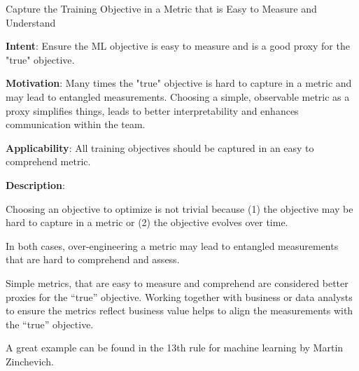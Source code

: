   
  \begin{frame}[plain]{ Capture the Training Objective in a Metric that is Easy to Measure and Understand
 }

  \textbf{Intent}: Ensure the ML objective is easy to measure and is a good proxy for the "true" objective. 
 

  \textbf{Motivation}: Many times the "true" objective is hard to capture in a metric and may lead to entangled measurements. Choosing a simple, observable metric as a proxy simplifies things, leads to better interpretability and enhances communication within the team. 
 

  \textbf{Applicability}: All training objectives should be captured in an easy to comprehend metric.
 

  \textbf{Description}: 

Choosing an objective to optimize is not trivial because (1) the objective may be hard to capture in a metric or (2) the objective evolves over time.


In both cases, over-engineering a metric may lead to entangled measurements that are hard to comprehend and assess.


Simple metrics, that are easy to measure and comprehend are considered better proxies for the ``true'' objective.
Working together with business or data analysts to ensure the metrics reflect business value helps to align the measurements with the ``true'' objective.


A great example can be found in the 13th rule for machine learning by Martin Zinchevich.


 


  \end{frame}

